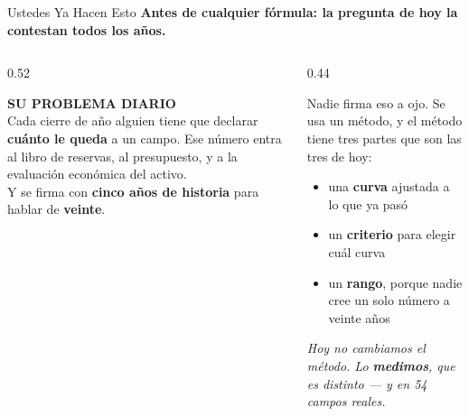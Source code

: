 \documentclass[aspectratio=169, 11pt]{beamer}
\begin{document}
\begin{frame}[shrink=6]{Ustedes Ya Hacen Esto}
  \vspace{-4pt}
  {\small\color{arcaDark}\bfseries
   Antes de cualquier fórmula: la pregunta de hoy la contestan todos los años.}
  \vspace{8pt}
  \begin{columns}[T]
    \begin{column}{0.52\textwidth}
      \begin{tcolorbox}[colback=arcaGray, colframe=arcaRed, boxrule=0pt, leftrule=3pt,
        arc=3pt, left=6pt, right=6pt, top=5pt, bottom=5pt]
        {\scriptsize\color{arcaRed}\bfseries\faUserCog\hspace{4pt}SU PROBLEMA DIARIO}\\[4pt]
        {\scriptsize\color{textMuted}
         Cada cierre de año alguien tiene que declarar \textbf{cuánto le queda}
         a un campo. Ese número entra al libro de reservas, al presupuesto,
         y a la evaluación económica del activo.\\[4pt]
         Y se firma con \textbf{cinco años de historia} para hablar de
         \textbf{veinte}.}
      \end{tcolorbox}
    \end{column}
    \begin{column}{0.44\textwidth}
      {\footnotesize\color{textMuted}
      Nadie firma eso a ojo. Se usa un método, y el método tiene tres partes
      que son las tres de hoy:
      \vspace{6pt}
      \begin{itemize}\setlength{\itemsep}{5pt}
        \item[{\color{arcaRed}\scriptsize\faArrowRight}]
          una \textbf{curva} ajustada a lo que ya pasó
        \item[{\color{arcaRed}\scriptsize\faArrowRight}]
          un \textbf{criterio} para elegir cuál curva
        \item[{\color{arcaRed}\scriptsize\faArrowRight}]
          un \textbf{rango}, porque nadie cree un solo número a veinte años
      \end{itemize}
      }
      \vspace{6pt}
      {\scriptsize\color{arcaDark}\itshape
        Hoy no cambiamos el método. Lo \textbf{medimos}, que es distinto ---
        y en 54 campos reales.}
    \end{column}
  \end{columns}
\end{frame}
\end{document}

